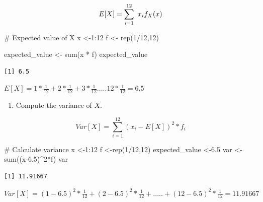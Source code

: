 \documentclass[
]{article}
\newenvironment{Shaded}{\begin{snugshade}}{\end{snugshade}}
\newcommand{\CommentTok}[1]{\textcolor[rgb]{0.37,0.37,0.37}{#1}}
\newcommand{\DecValTok}[1]{\textcolor[rgb]{0.68,0.00,0.00}{#1}}
\newcommand{\FloatTok}[1]{\textcolor[rgb]{0.68,0.00,0.00}{#1}}
\newcommand{\FunctionTok}[1]{\textcolor[rgb]{0.28,0.35,0.67}{#1}}
\newcommand{\NormalTok}[1]{\textcolor[rgb]{0.00,0.23,0.31}{#1}}
\newcommand{\OtherTok}[1]{\textcolor[rgb]{0.00,0.23,0.31}{#1}}
\newcommand{\SpecialCharTok}[1]{\textcolor[rgb]{0.37,0.37,0.37}{#1}}
\providecommand{\tightlist}{%
  \setlength{\itemsep}{0pt}\setlength{\parskip}{0pt}}
\begin{document}
\begin{tcolorbox}[enhanced jigsaw, arc=.35mm, bottomrule=.15mm, breakable, colback=white, colframe=quarto-callout-tip-color-frame, left=2mm, leftrule=.75mm, opacityback=0, rightrule=.15mm, toprule=.15mm]

\[{E}[X]=\sum_{i=1}^{12}~x_i\*f_X(x)\]

\begin{Shaded}
\begin{Highlighting}[]
\CommentTok{\# Expected value of X}
\NormalTok{x }\OtherTok{\textless{}{-}}\DecValTok{1}\SpecialCharTok{:}\DecValTok{12}
\NormalTok{f }\OtherTok{\textless{}{-}} \FunctionTok{rep}\NormalTok{(}\DecValTok{1}\SpecialCharTok{/}\DecValTok{12}\NormalTok{,}\DecValTok{12}\NormalTok{)}

\NormalTok{expected\_value }\OtherTok{\textless{}{-}} \FunctionTok{sum}\NormalTok{(x }\SpecialCharTok{*}\NormalTok{ f)}
\NormalTok{expected\_value}
\end{Highlighting}
\end{Shaded}

\begin{verbatim}
[1] 6.5
\end{verbatim}

\end{tcolorbox}

\({E}[X]=1*\frac{1}{12} + 2*\frac{1}{12}+3*\frac{1}{12}.....12*\frac{1}{12}=6.5\)

\begin{enumerate}
\def\labelenumi{(\alph{enumi})}
\setcounter{enumi}{2}
\tightlist
\item
  Compute the variance of \(X\).
\end{enumerate}

\begin{tcolorbox}[enhanced jigsaw, arc=.35mm, bottomrule=.15mm, breakable, colback=white, colframe=quarto-callout-tip-color-frame, left=2mm, leftrule=.75mm, opacityback=0, rightrule=.15mm, toprule=.15mm]

\[{Var}[X]=\sum_{i=1}^{12} (x_i-{E}[X])^2*f_i\]

\begin{Shaded}
\begin{Highlighting}[]
\CommentTok{\# Calculate variance}
\NormalTok{x }\OtherTok{\textless{}{-}}\DecValTok{1}\SpecialCharTok{:}\DecValTok{12}
\NormalTok{f }\OtherTok{\textless{}{-}}\FunctionTok{rep}\NormalTok{(}\DecValTok{1}\SpecialCharTok{/}\DecValTok{12}\NormalTok{,}\DecValTok{12}\NormalTok{)}
\NormalTok{expected\_value }\OtherTok{\textless{}{-}}\FloatTok{6.5}
\NormalTok{var }\OtherTok{\textless{}{-}} \FunctionTok{sum}\NormalTok{((x}\FloatTok{{-}6.5}\NormalTok{)}\SpecialCharTok{\^{}}\DecValTok{2}\SpecialCharTok{*}\NormalTok{f)}
\NormalTok{var}
\end{Highlighting}
\end{Shaded}

\begin{verbatim}
[1] 11.91667
\end{verbatim}

\({Var}[X]=(1-6.5)^2 *\frac{1}{12} + (2-6.5)^2*\frac{1}{12}+.....+(12-6.5)^2*\frac{1}{12}=11.91667\)

\end{tcolorbox}
\end{document}
